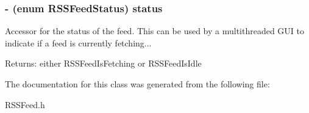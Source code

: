 \subsubsection{\setlength{\rightskip}{0pt plus 5cm}- (enum RSSFeed\-Status) status }\label{interfaceRSSFeed_a5}


Accessor for the status of the feed. This can be used by a multithreaded GUI to indicate if a feed is currently fetching...

\begin{Desc}
\item[Returns:]either RSSFeed\-Is\-Fetching or RSSFeed\-Is\-Idle\end{Desc}


The documentation for this class was generated from the following file:\begin{CompactItemize}
\item 
RSSFeed.h\end{CompactItemize}
